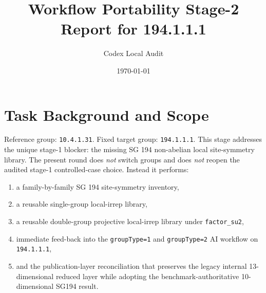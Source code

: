 \documentclass[11pt]{article}
\title{Workflow Portability Stage-2 Report for 194.1.1.1}
\author{Codex Local Audit}
\date{\today}
\begin{document}
\maketitle

\section{Task Background and Scope}
Reference group: \texttt{10.4.1.31}. Fixed target group: \texttt{194.1.1.1}. This stage addresses the unique stage-1 blocker: the missing SG 194 non-abelian local site-symmetry library. The present round does \emph{not} switch groups and does \emph{not} reopen the audited stage-1 controlled-case choice. Instead it performs:
\begin{enumerate}
\item a family-by-family SG 194 site-symmetry inventory,
\item a reusable single-group local-irrep library,
\item a reusable double-group projective local-irrep library under \texttt{factor\_su2},
\item immediate feed-back into the \texttt{groupType=1} and \texttt{groupType=2} AI workflow on \texttt{194.1.1.1},
\item and the publication-layer reconciliation that preserves the legacy internal 13-dimensional reduced layer while adopting the benchmark-authoritative 10-dimensional SG194 result.
\end{enumerate}
\end{document}
